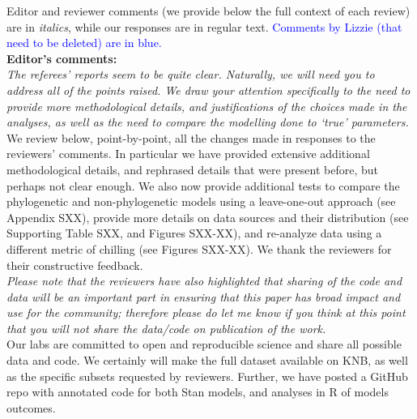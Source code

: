 \documentclass[11pt]{article}
\begin{document}
Editor and reviewer comments (we provide below the full context of each review) are in \emph{italics}, while our responses are in regular text. \textcolor{blue}{Comments by Lizzie (that need to be deleted) are in blue.}\\ %

{\bf Editor's comments:} \\


\emph{The referees’ reports seem to be quite clear. Naturally, we will need you to address all of the points raised. We draw your attention specifically to the need to provide more methodological details, and justifications of the choices made in the analyses, as well as the need to compare the modelling done to `true' parameters.}\\

We review below, point-by-point, all the changes made in responses to the reviewers' comments. In particular we have provided extensive additional methodological details, and rephrased details that were present before, but perhaps not clear enough. We also now provide additional tests to compare the phylogenetic and non-phylogenetic models using a leave-one-out approach (see Appendix SXX), provide more details on data sources and their distribution (see Supporting Table SXX, and Figures SXX-XX), and re-analyze data using a different metric of chilling (see Figures SXX-XX). We thank the reviewers for their constructive feedback.\\

\emph{Please note that the reviewers have also highlighted that sharing of the code and data will be an important part in ensuring that this paper has broad impact and use for the community; therefore please do let me know if you think at this point that you will not share the data/code on publication of the work.}\\

Our labs are committed to open and reproducible science and share all possible data and code. We certainly will make the full dataset available on KNB, as well as the specific subsets requested by reviewers. Further, we have posted a GitHub repo with annotated code for both Stan models, and analyses in R of models outcomes.\\
\end{document}
